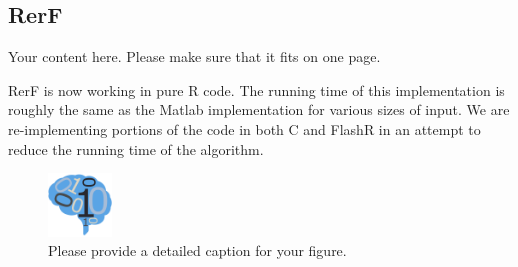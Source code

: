 \documentclass[simplex.tex]{subfiles}
\begin{document}
\subsection{RerF}


Your content here. Please make sure that it fits on one page.

RerF is now working in pure R code.  The running time of this implementation is roughly the same as the Matlab implementation for various sizes of input.  We are re-implementing portions of the code in both C and FlashR in an attempt to reduce the running time of the algorithm.

\begin{figure}[!h]
\begin{cframed}
\centering
\includegraphics[width=0.15\textwidth]{neurodata_small.png}
\caption{Please provide a detailed caption for your figure.}
\label{fig:meda}
\end{cframed}
\end{figure}
\clearpage
\end{document}
